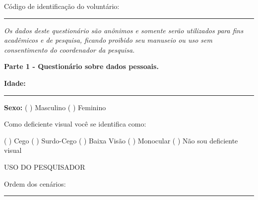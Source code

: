 {\color{gray}

Código de identificação do voluntário: \rule{1in}{.2mm}

\textit{Os dados deste questionário são anônimos e somente serão utilizados para fins acadêmicos e de pesquisa, ficando proibido seu manuseio ou uso sem consentimento do coordenador da pesquisa.}
}

\begin{center}
\textbf{Parte 1 - Questionário sobre dados pessoais.}
\end{center}


\textbf{Idade:} \rule{1in}{.2mm} \hfill \textbf{Sexo:}   ( ) Masculino \hfill ( ) Feminino

\vspace{2cm}

Como deficiente visual você se identifica como:

\noindent
( ) Cego \hfill \break
( ) Surdo-Cego \hfill \break
( ) Baixa Visão \hfill \break
( ) Monocular \hfill \break
( ) Não sou deficiente visual \hfill \break

USO DO PESQUISADOR

\vspace{1cm}

Ordem dos cenários:

\vspace{1cm}

\rule{10cm}{0.1mm}

\pagebreak